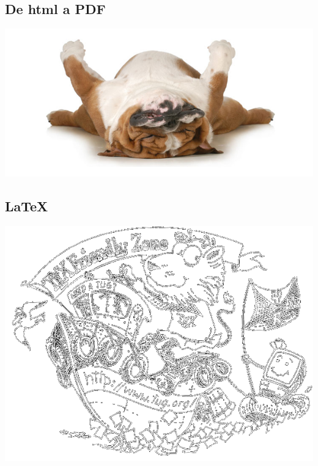 \documentclass[8pt,xcolor={usenames,dvipsnames}]{beamer}
\begin{document}
\subsection{De html a PDF}

\begin{frame}
\includegraphics[width=\paperwidth]{images/lazydog.jpg}

\end{frame}

\subsection{\LaTeX}

\begin{frame}

\includegraphics[height=\paperheight]{images/tugboat_tfz.png}

\end{frame}
\end{document}
